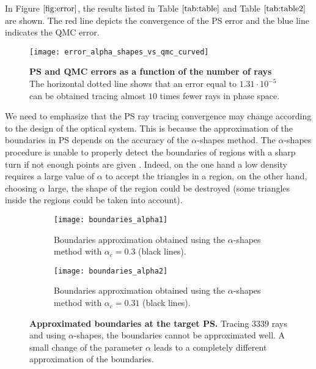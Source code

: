\noindent In Figure $\ref{fig:error}$, the results listed in Table $\ref{tab:table}$ and Table $\ref{tab:table2}$ are shown. The red line depicts the convergence of the PS error and the blue line indicates the QMC error.
\begin{figure}[h]
  \begin{center}
  \texttt{[image: error\_alpha\_shapes\_vs\_qmc\_curved]}
  \end{center}
  \caption{\textbf{PS and QMC errors as a function of the number of rays}
  The horizontal dotted line shows that an error equal to $1.31\cdot  10^{-5}$ can be obtained tracing almost $10$ times fewer rays in phase space.}
  \label{fig:error}
\end{figure}
We need to emphasize that the PS ray tracing convergence may change according to the design of the optical system.
This is because the approximation of the boundaries in PS depends on the accuracy of the $\alpha$-shapes method.
The $\alpha$-shapes procedure is unable to properly detect the boundaries of regions with a sharp turn if not enough points are given
\cite{teichmann1998surface}. Indeed, on the one hand a low density requires a large value of $\alpha$ to accept the triangles in a region, on the other hand,
 choosing $\alpha$ large, the shape of the region could be destroyed (some triangles inside the regions could be taken into account).
\begin{figure}[t]
\centering
\begin{subfigure}{.48\textwidth}
  \centering
  \texttt{[image: boundaries\_alpha1]}
  \caption{Boundaries approximation obtained using the $\alpha$-shapes method with $\alpha_c = 0.3$ (black lines).}
\end{subfigure}
\hfill
\begin{subfigure}{.48\textwidth}
  \centering
  \texttt{[image: boundaries\_alpha2]}
  \caption{Boundaries approximation obtained using the $\alpha$-shapes method with $\alpha_c = 0.31$ (black lines).}
\end{subfigure}
\caption{\textbf{Approximated boundaries at the target PS.} Tracing $3339$ rays and using $\alpha$-shapes, the boundaries cannot be approximated well. 
A small change of the parameter $\alpha$ leads to a completely different approximation of the boundaries.}
\label{fig:Tir1}
\end{figure}
